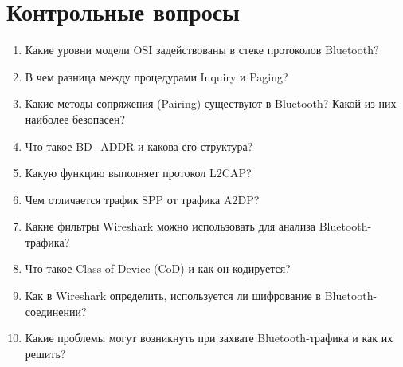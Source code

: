 \section*{Контрольные вопросы}
\begin{enumerate}[nosep, leftmargin=*]
    \item Какие уровни модели OSI задействованы в стеке протоколов Bluetooth?
    \item В чем разница между процедурами Inquiry и Paging?
    \item Какие методы сопряжения (Pairing) существуют в Bluetooth? Какой из них наиболее безопасен?
    \item Что такое BD\_ADDR и какова его структура?
    \item Какую функцию выполняет протокол L2CAP?
    \item Чем отличается трафик SPP от трафика A2DP?
    \item Какие фильтры Wireshark можно использовать для анализа Bluetooth-трафика?
    \item Что такое Class of Device (CoD) и как он кодируется?
    \item Как в Wireshark определить, используется ли шифрование в Bluetooth-соединении?
    \item Какие проблемы могут возникнуть при захвате Bluetooth-трафика и как их решить?
\end{enumerate}
